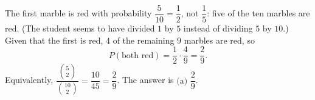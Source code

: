 The first marble is red with probability $\dfrac{5}{10}=\dfrac{1}{2}$, not $\dfrac{1}{5}$: five of the ten marbles are red. (The student seems to have divided $1$ by $5$ instead of dividing $5$ by $10$.) Given that the first is red, $4$ of the remaining $9$ marbles are red, so
\[
P(\text{both red})=\dfrac{1}{2}\cdot\dfrac{4}{9}=\dfrac{2}{9} .
\]
Equivalently, $\dfrac{\binom52}{\binom{10}2}=\dfrac{10}{45}=\dfrac{2}{9}$. The answer is $\boxed{\text{(a) }\dfrac{2}{9}}$.
